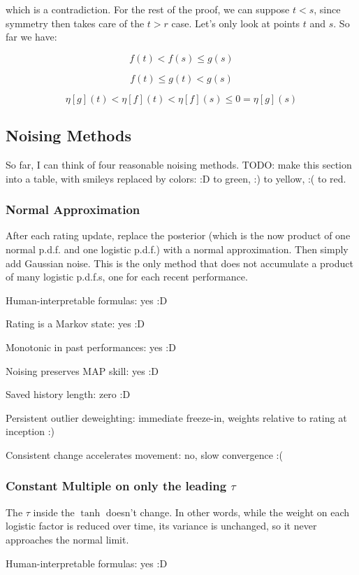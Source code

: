 \documentclass{article}
\begin{document}
which is a contradiction. For the rest of the proof, we can suppose $t < s$, since symmetry then takes care of the $t > r$ case. Let's only look at points $t$ and $s$. So far we have:

\[ f(t) < f(s) \le g(s) \]

\[ f(t) \le g(t) < g(s) \]

\[ \eta[g](t) < \eta[f](t) < \eta[f](s) \le 0 = \eta[g](s) \]

\subsection{Noising Methods}

So far, I can think of four reasonable noising methods. TODO: make this section into a table, with smileys replaced by colors: :D to green, :) to yellow, :( to red.

\subsubsection{Normal Approximation}

After each rating update, replace the posterior (which is the now product of one normal p.d.f. and one logistic p.d.f.) with a normal approximation. Then simply add Gaussian noise. This is the only method that does not accumulate a product of many logistic p.d.f.s, one for each recent performance.

Human-interpretable formulas: yes :D

Rating is a Markov state: yes :D

Monotonic in past performances: yes :D

Noising preserves MAP skill: yes :D

Saved history length: zero :D

Persistent outlier deweighting: immediate freeze-in, weights relative to rating at inception :)

Consistent change accelerates movement: no, slow convergence :(

\subsubsection{Constant Multiple on only the leading $\tau$}

The $\tau$ inside the $\tanh$ doesn't change. In other words, while the weight on each logistic factor is reduced over time, its variance is unchanged, so it never approaches the normal limit.

Human-interpretable formulas: yes :D
\end{document}
